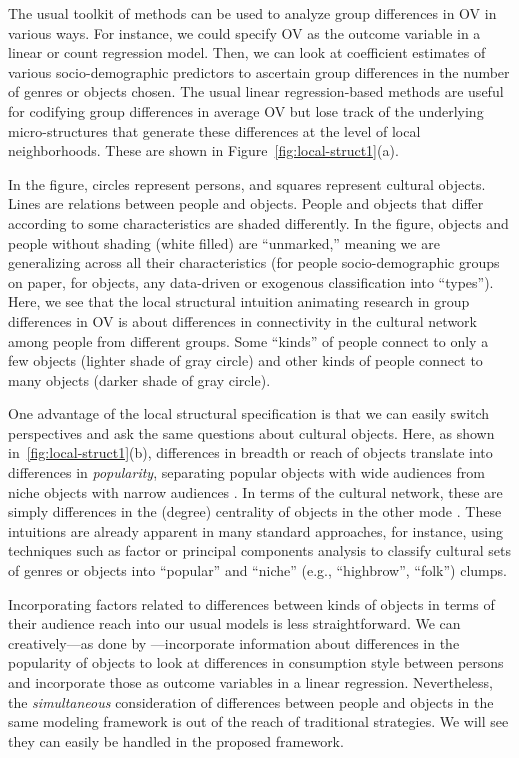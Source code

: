 \documentclass[preprint,12pt,authoryear]{elsarticle}
\begin{document}
The usual toolkit of methods can be used to analyze group differences in OV in various ways. For instance, we could specify OV as the outcome variable in a linear or count regression model. Then, we can look at coefficient estimates of various socio-demographic predictors to ascertain group differences in the number of genres or objects chosen. The usual linear regression-based methods are useful for codifying group differences in average OV but lose track of the underlying micro-structures that generate these differences at the level of local neighborhoods. These are shown in Figure~\ref{fig:local-struct1}(a). 

In the figure, circles represent persons, and squares represent cultural objects. Lines are relations between people and objects. People and objects that differ according to some characteristics are shaded differently. In the figure, objects and people without shading (white filled) are ``unmarked,'' meaning we are generalizing across all their characteristics (for people socio-demographic groups on paper, for objects, any data-driven or exogenous classification into ``types''). Here, we see that the local structural intuition animating research in group differences in OV is about differences in connectivity in the cultural network among people from different groups. Some ``kinds'' of people connect to only a few objects (lighter shade of gray circle) and other kinds of people connect to many objects (darker shade of gray circle). 

One advantage of the local structural specification is that we can easily switch perspectives and ask the same questions about cultural objects. Here, as shown in~\ref{fig:local-struct1}(b), differences in breadth or reach of objects translate into differences in \textit{popularity}, separating popular objects with wide audiences from niche objects with narrow audiences \citep{lizardo2018mutual}. In terms of the cultural network, these are simply differences in the (degree) centrality of objects in the other mode \citep{faust1997centrality}. These intuitions are already apparent in many standard approaches, for instance, using techniques such as factor or principal components analysis to classify cultural sets of genres or objects into ``popular'' and ``niche'' (e.g., ``highbrow'', ``folk'') clumps. 

Incorporating factors related to differences between kinds of objects in terms of their audience reach into our usual models is less straightforward. We can creatively---as done by \citet{puetz2021taste}---incorporate information about differences in the popularity of objects to look at differences in consumption style between persons and incorporate those as outcome variables in a linear regression. Nevertheless, the \textit{simultaneous} consideration of differences between people and objects in the same modeling framework is out of the reach of traditional strategies. We will see they can easily be handled in the proposed framework.
\end{document}
